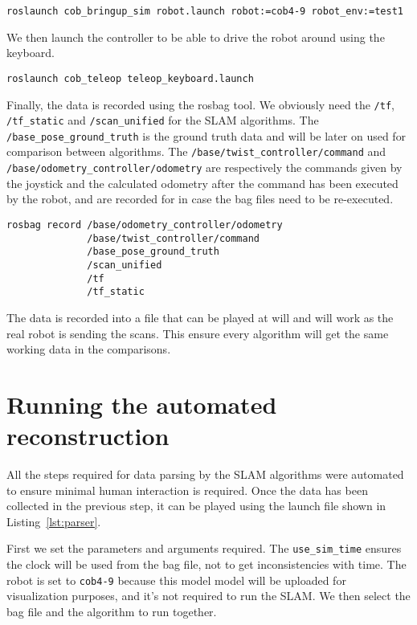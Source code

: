 \begin{verbatim}
roslaunch cob_bringup_sim robot.launch robot:=cob4-9 robot_env:=test1
\end{verbatim}

We then launch the controller to be able to drive the robot around using the keyboard.

\begin{verbatim}
roslaunch cob_teleop teleop_keyboard.launch 
\end{verbatim}

Finally, the data is recorded using the rosbag tool. We obviously need the \texttt{/tf}, \texttt{/tf\_static} and \texttt{/scan\_unified} for the SLAM algorithms. The \texttt{/base\_pose\_ground\_truth} is the ground truth data and will be later on used for comparison between algorithms. The \texttt{/base/twist\_controller/command} and  \texttt{/base/odometry\_controller/odometry} are respectively the commands given by the joystick and the calculated odometry after the command has been executed by the robot, and are recorded for in case the bag files need to be re-executed.

\begin{verbatim}
rosbag record /base/odometry_controller/odometry
              /base/twist_controller/command
              /base_pose_ground_truth
              /scan_unified
              /tf
              /tf_static
\end{verbatim}

The data is recorded into a file that can be played at will and will work as the real robot is sending the scans. This ensure every algorithm will get the same working data in the comparisons.

\section{Running the automated reconstruction}

All the steps required for data parsing by the SLAM algorithms were automated to ensure minimal human interaction is required. Once the data has been collected in the previous step, it can be played using the launch file shown in Listing~\ref{lst:parser}.

First we set the parameters and arguments required. The \texttt{use\_sim\_time} ensures the clock will be used from the bag file, not to get inconsistencies with time. The robot is set to \texttt{cob4-9} because this model model will be uploaded for visualization purposes, and it's not required to run the SLAM. We then select the bag file and the algorithm to run together.

